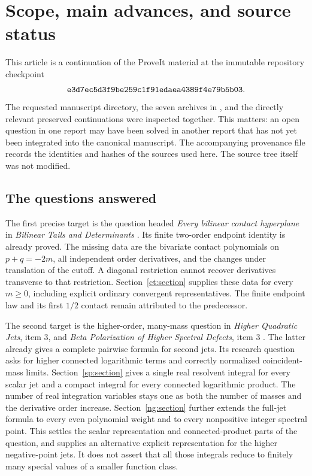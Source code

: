 \section{Scope, main advances, and source status}
\label{bc:scope}

This article is a continuation of the ProveIt material at the immutable
repository checkpoint
\[
 \texttt{e3d7ec5d3f9be259c1f91edaea4389f4e79b5b03} .
\]
The requested manuscript directory, the seven archives in
, and the directly relevant preserved continuations were
inspected together. This matters: an open question in one report may have
been solved in another report that has not yet been integrated into the
canonical manuscript. The accompanying provenance file records the
identities and hashes of the sources used here. The source tree itself was
not modified.

\subsection{The questions answered}

The first precise target is the question headed \emph{Every bilinear contact
hyperplane} in \emph{Bilinear Tails and Determinants}
\cite{ProveItBilinear}. Its finite two-order endpoint identity is already
proved. The missing data are the bivariate contact polynomials on
\(p+q=-2m\), all independent order derivatives, and the changes under
translation of the cutoff. A diagonal restriction cannot recover
derivatives transverse to that restriction. Section~\ref{ct:section}
supplies these data for every \(m\ge0\), including explicit ordinary
convergent representatives. The finite endpoint law and its first
\(1/2\) contact remain attributed to the predecessor.

The second target is the higher-order, many-mass question in
\emph{Higher Quadratic Jets}, item 3, and \emph{Beta Polarization of Higher
Spectral Defects}, item 3
\cite{ProveItHigherQuadratic,ProveItHigherDefects}. The latter already gives
a complete pairwise formula for second jets. Its research question asks
for higher connected logarithmic terms and correctly normalized
coincident-mass limits. Section~\ref{sp:section} gives a single real
resolvent integral for every scalar jet and a compact integral for every
connected logarithmic product. The number of real integration variables
stays one as both the number of masses and the derivative order increase.
Section~\ref{ng:section} further extends the full-jet formula to every
even polynomial weight and to every nonpositive integer spectral point.
This settles the scalar representation and connected-product parts of the
question, and supplies an alternative explicit representation for the
higher negative-point jets. It does not assert that all those integrals reduce to finitely
many special values of a smaller function class.

